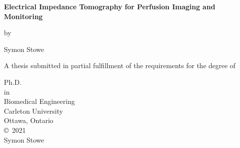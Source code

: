 
\thispagestyle{empty}
\begin{center}

\LARGE

\textbf{Electrical Impedance Tomography for Perfusion Imaging and Monitoring}

\vspace{6mm}
\large
by 

\vspace{-2mm}
\LARGE
Symon Stowe

\vspace{15mm}
\large
A thesis submitted in partial fulfillment of 
the requirements for the degree of

\vspace{12mm}
\large
Ph.D.\\

in \\

\vspace{1mm}
Biomedical Engineering\\

\vspace{12mm}
\large
Carleton University \\
Ottawa, Ontario\\

\vspace{12mm}
\large
\copyright~2021 \\
Symon Stowe
\end{center}
